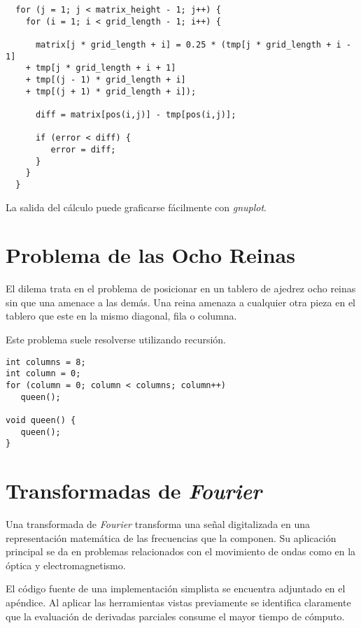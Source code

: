 \documentclass[a4paper]{report}
\begin{document}
\begin{verbatim}
  for (j = 1; j < matrix_height - 1; j++) {
    for (i = 1; i < grid_length - 1; i++) {
      
      matrix[j * grid_length + i] = 0.25 * (tmp[j * grid_length + i - 1]
    + tmp[j * grid_length + i + 1]
    + tmp[(j - 1) * grid_length + i]
    + tmp[(j + 1) * grid_length + i]);

      diff = matrix[pos(i,j)] - tmp[pos(i,j)];

      if (error < diff) {
         error = diff;
      }
    }
  }
\end{verbatim}

La salida del c\'alculo puede graficarse f\'acilmente con {\it gnuplot}.

\section{Problema de las Ocho Reinas}

El dilema trata en el problema de posicionar en un tablero de ajedrez ocho
reinas sin que una amenace a las dem\'as. Una reina amenaza a cualquier otra
pieza en el tablero que este en la mismo diagonal, fila o columna.

\bigskip

Este problema suele resolverse utilizando recursi\'on.

\begin{verbatim}
int columns = 8;
int column = 0;
for (column = 0; column < columns; column++)
   queen();

void queen() {
   queen();
}
\end{verbatim}

\section{Transformadas de {\it Fourier}}

Una transformada de {\it Fourier} \cite{fourier} transforma una se\~nal
digitalizada en una representaci\'on matem\'atica de las frecuencias que la
componen. Su aplicaci\'on principal se da en problemas relacionados con el
movimiento de ondas como en la \'optica y electromagnetismo.

\bigskip

El c\'odigo fuente de una implementaci\'on simplista se encuentra adjuntado en
el ap\'endice. Al aplicar las herramientas vistas previamente se identifica
claramente que la evaluaci\'on de derivadas parciales consume el mayor tiempo
de c\'omputo.
\end{document}
